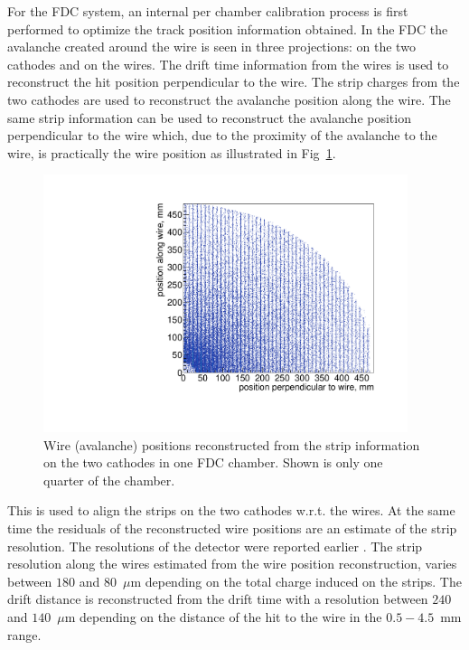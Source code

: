 For the FDC system, an internal per chamber calibration process is first performed to optimize the track position information obtained.  
In the FDC the avalanche created around the wire is seen in three projections: on the two cathodes and on the wires.
The drift time information from the wires is used to reconstruct the hit position perpendicular to the wire.
The strip charges from the two cathodes are used to reconstruct the avalanche position along the wire. 
The same strip information can be used to reconstruct the avalanche position perpendicular to the wire which, due to the proximity of the avalanche to the wire, is practically the wire position as illustrated in Fig~\ref{FDC_wires_from_strips}.
\begin{figure}[tbp]
\begin{center}
\includegraphics[width=0.95\textwidth]{figures/FDC_wires_from_strips1.pdf}  
\caption{\label{FDC_wires_from_strips} Wire (avalanche) positions reconstructed from the strip information on the two cathodes in one FDC chamber. Shown is only one quarter of the chamber.
}   
\end{center}  
\end{figure}
This is used to align the strips on the two cathodes w.r.t. the wires. 
At the same time the residuals of the reconstructed wire positions are an estimate of the strip resolution.
The resolutions of the detector were reported earlier \cite{FDC_NIM}. 
The strip resolution along the wires estimated from the wire position reconstruction, varies between $180$ and $80$~$\mu$m depending on the total charge induced on the strips. The drift distance is reconstructed from the drift time with a resolution between $240$ and $140$~$\mu$m
depending on the distance of the hit to the wire in the $0.5-4.5$~mm range.  

